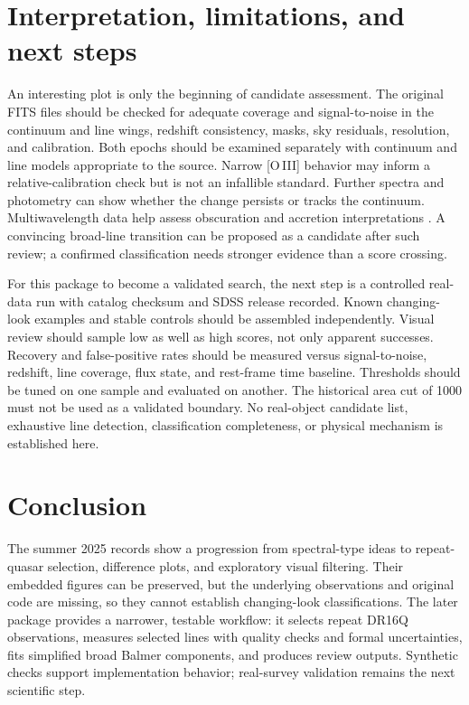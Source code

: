 \documentclass[11pt,a4paper]{article}
\begin{document}
\section{Interpretation, limitations, and next steps}
An interesting plot is only the beginning of candidate assessment. The original FITS files should be checked for adequate coverage and signal-to-noise in the continuum and line wings, redshift consistency, masks, sky residuals, resolution, and calibration. Both epochs should be examined separately with continuum and line models appropriate to the source. Narrow [O\,III] behavior may inform a relative-calibration check but is not an infallible standard. Further spectra and photometry can show whether the change persists or tracks the continuum. Multiwavelength data help assess obscuration and accretion interpretations \cite{ricci2023,guo2024}. A convincing broad-line transition can be proposed as a candidate after such review; a confirmed classification needs stronger evidence than a score crossing.

For this package to become a validated search, the next step is a controlled real-data run with catalog checksum and SDSS release recorded. Known changing-look examples and stable controls should be assembled independently. Visual review should sample low as well as high scores, not only apparent successes. Recovery and false-positive rates should be measured versus signal-to-noise, redshift, line coverage, flux state, and rest-frame time baseline. Thresholds should be tuned on one sample and evaluated on another. The historical area cut of 1000 must not be used as a validated boundary. No real-object candidate list, exhaustive line detection, classification completeness, or physical mechanism is established here.

\section{Conclusion}
The summer 2025 records show a progression from spectral-type ideas to repeat-quasar selection, difference plots, and exploratory visual filtering. Their embedded figures can be preserved, but the underlying observations and original code are missing, so they cannot establish changing-look classifications. The later package provides a narrower, testable workflow: it selects repeat DR16Q observations, measures selected lines with quality checks and formal uncertainties, fits simplified broad Balmer components, and produces review outputs. Synthetic checks support implementation behavior; real-survey validation remains the next scientific step.
\end{document}
